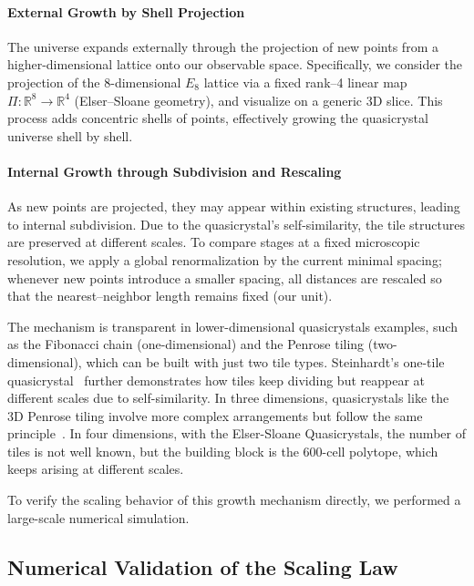 \documentclass[universe,article,submit,pdftex,moreauthors]{Definitions/mdpi}
\begin{document}
\paragraph{\textbf{External Growth by Shell Projection}}

The universe expands externally through the projection of new points from a higher-dimensional lattice onto our observable space. Specifically, we consider the projection of the 8-dimensional $E_8$ lattice via a fixed rank–4 linear map $\Pi:\mathbb{R}^8\!\to\!\mathbb{R}^4$ (Elser–Sloane geometry), and visualize on a generic 3D slice.
This process adds concentric shells of points, effectively growing the quasicrystal universe shell by shell.

\paragraph{\textbf{Internal Growth through Subdivision and Rescaling}}

As new points are projected, they may appear within existing structures, leading to internal subdivision. Due to the quasicrystal's self-similarity, the tile structures are preserved at different scales. To compare stages at a fixed microscopic resolution, we apply a global renormalization by the current minimal spacing; whenever new points introduce a smaller spacing, all distances are rescaled so that the nearest–neighbor length remains fixed (our unit).

The mechanism is transparent in lower-dimensional quasicrystals examples, such as the Fibonacci chain (one-dimensional) and the Penrose tiling (two-dimensional), which can be built with just two tile types. Steinhardt's one-tile quasicrystal~\cite{Steinhardt1996} further demonstrates how tiles keep dividing but reappear at different scales due to self-similarity. In three dimensions, quasicrystals like the 3D Penrose tiling involve more complex arrangements but follow the same principle~\cite{Duneau1985}. In four dimensions, with the Elser-Sloane Quasicrystals, the number of tiles is not well known, but the building block is the 600-cell polytope, which keeps arising at different scales.

To verify the scaling behavior of this growth mechanism directly, we performed a large-scale numerical simulation.

\subsection{Numerical Validation of the Scaling Law}
\end{document}
